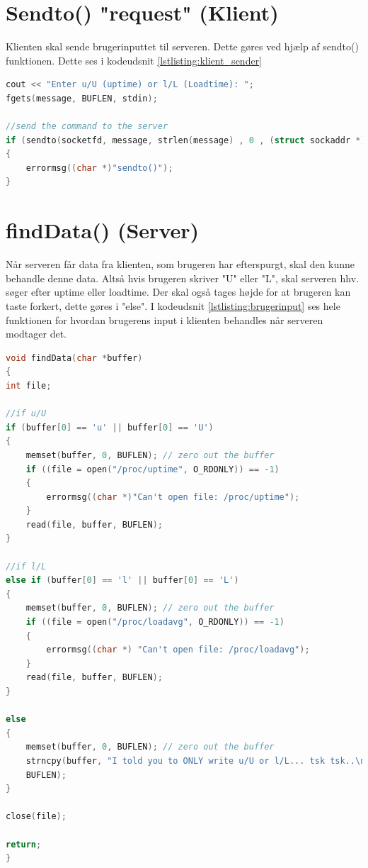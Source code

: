 \documentclass[12pt,fleqn,a4paper]{report}
\begin{document}
\section{Sendto() "request" (Klient)}
Klienten skal sende brugerinputtet til serveren. Dette gøres ved hjælp af sendto() funktionen. Dette ses i kodeudsnit \ref{lstlisting:klient_sender}
\begin{framed}
	\begin{lstlisting}[language=C++]
cout << "Enter u/U (uptime) or l/L (Loadtime): ";
fgets(message, BUFLEN, stdin);

//send the command to the server
if (sendto(socketfd, message, strlen(message) , 0 , (struct sockaddr *) &serv_addr, slen)==-1)
{
	errormsg((char *)"sendto()");
}	
	\end{lstlisting}
\end{framed}
\label{lstlisting:klient_sender}
\vspace{5mm} %

\section{findData() (Server)}
Når serveren får data fra klienten, som brugeren har efterspurgt, skal den kunne behandle denne data. Altså hvis brugeren skriver "U" eller "L", skal serveren hhv. søger efter uptime eller loadtime. Der skal også tages højde for at brugeren kan taste forkert, dette gøres i "else". I kodeudsnit \ref{lstlisting:brugerinput} ses hele funktionen for hvordan brugerens input i klienten behandles når serveren modtager det.

\begin{framed}
	\begin{lstlisting}[language=C++]
void findData(char *buffer)
{
int file;
	
//if u/U
if (buffer[0] == 'u' || buffer[0] == 'U')
{
	memset(buffer, 0, BUFLEN); // zero out the buffer
	if ((file = open("/proc/uptime", O_RDONLY)) == -1)
	{
		errormsg((char *)"Can't open file: /proc/uptime");
	}
	read(file, buffer, BUFLEN);
}
	
//if l/L
else if (buffer[0] == 'l' || buffer[0] == 'L')
{
	memset(buffer, 0, BUFLEN); // zero out the buffer
	if ((file = open("/proc/loadavg", O_RDONLY)) == -1)
	{
		errormsg((char *) "Can't open file: /proc/loadavg");
	}
	read(file, buffer, BUFLEN);
}
	
else
{
	memset(buffer, 0, BUFLEN); // zero out the buffer
	strncpy(buffer, "I told you to ONLY write u/U or l/L... tsk tsk..\n",
	BUFLEN);
}

close(file);
	
return;
}	
	\end{lstlisting}
\end{framed}
\label{lstlisting:brugerinput}
\vspace{5mm} %
\end{document}
